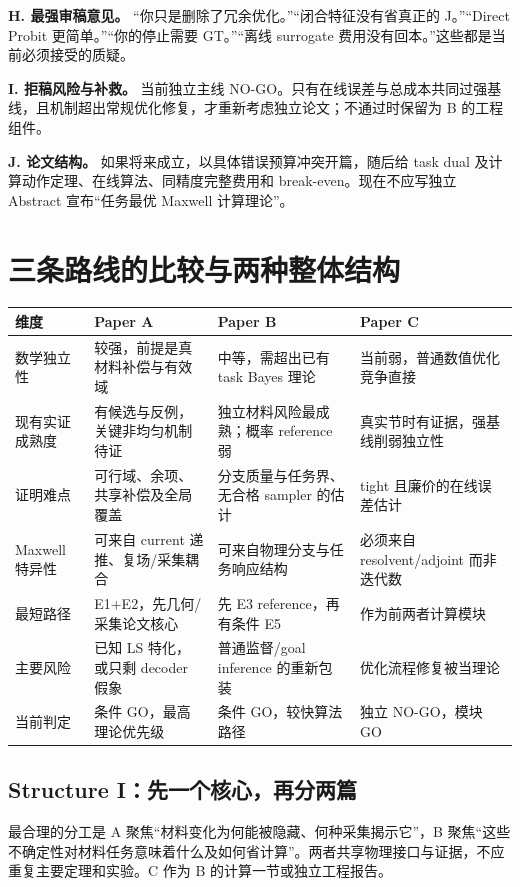 \textbf{H. 最强审稿意见。} “你只是删除了冗余优化。”“闭合特征没有省真正的 J。”“Direct Probit 更简单。”“你的停止需要 GT。”“离线 surrogate 费用没有回本。”这些都是当前必须接受的质疑。

\textbf{I. 拒稿风险与补救。} 当前独立主线 NO-GO。只有在线误差与总成本共同过强基线，且机制超出常规优化修复，才重新考虑独立论文；不通过时保留为 B 的工程组件。

\textbf{J. 论文结构。} 如果将来成立，以具体错误预算冲突开篇，随后给 task dual 及计算动作定理、在线算法、同精度完整费用和 break-even。现在不应写独立 Abstract 宣布“任务最优 Maxwell 计算理论”。

\section{三条路线的比较与两种整体结构}
\begin{longtable}{p{.16\linewidth}p{.25\linewidth}p{.25\linewidth}p{.25\linewidth}}
\toprule
维度 & Paper A & Paper B & Paper C\\
\midrule
数学独立性 & 较强，前提是真材料补偿与有效域 & 中等，需超出已有 task Bayes 理论 & 当前弱，普通数值优化竞争直接\\
现有实证成熟度 & 有候选与反例，关键非均匀机制待证 & 独立材料风险最成熟；概率 reference 弱 & 真实节时有证据，强基线削弱独立性\\
证明难点 & 可行域、余项、共享补偿及全局覆盖 & 分支质量与任务界、无合格 sampler 的估计 & tight 且廉价的在线误差估计\\
Maxwell 特异性 & 可来自 current 递推、复场/采集耦合 & 可来自物理分支与任务响应结构 & 必须来自 resolvent/adjoint 而非迭代数\\
最短路径 & E1+E2，先几何/采集论文核心 & 先 E3 reference，再有条件 E5 & 作为前两者计算模块\\
主要风险 & 已知 LS 特化，或只剩 decoder 假象 & 普通监督/goal inference 的重新包装 & 优化流程修复被当理论\\
当前判定 & 条件 GO，最高理论优先级 & 条件 GO，较快算法路径 & 独立 NO-GO，模块 GO\\
\bottomrule
\end{longtable}

\subsection{Structure I：先一个核心，再分两篇}
最合理的分工是 A 聚焦“材料变化为何能被隐藏、何种采集揭示它”，B 聚焦“这些不确定性对材料任务意味着什么及如何省计算”。两者共享物理接口与证据，不应重复主要定理和实验。C 作为 B 的计算一节或独立工程报告。

